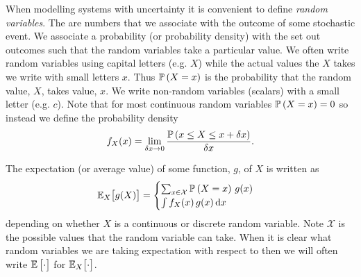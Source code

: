 \documentclass{sotonExamBoxes}    %
\begin{document}


\maketitle

When modelling systems with uncertainty it is convenient to define
\textit{random variables}.  The are numbers that we associate with the
outcome of some stochastic event.  We associate a probability (or
probability density) with the set out outcomes such that the random
variables take a particular value.  We often write random
variables using capital letters (e.g. $X$) while the actual values the
$X$ takes we write with small letters $x$.  Thus $\Prob{X=x}$ is the
probability that the random value, $X$, takes value, $x$.  We write
non-random variables (scalars) with a small letter (e.g. $c$).  Note
that for most continuous random variables $\Prob{X=x}=0$ so instead we
define the probability density
\begin{align*}
  f_X(x) = \lim_{\delta x \rightarrow 0} \frac{\Prob{x\leq X \leq
  x+\delta x}}{\delta x}.
\end{align*}

The expectation (or average value) of some function, $g$, of $X$ is
written as
\begin{align*}
  \av[X]{g(X)} =
  \begin{cases}
    \sum_{x\in \mathcal{X}} \Prob{X=x}\, g(x) \\
    \int f_X(x) \, g(x)\, \dd x
  \end{cases}
\end{align*}
depending on whether $X$ is a continuous or discrete random variable.
Note $\mathcal{X}$ is the possible values that the random variable can take.
When it is clear what random variables we are taking expectation with
respect to then we will often write $\av{\cdot}$ for $\av[X]{\cdot}$.




\end{document}
